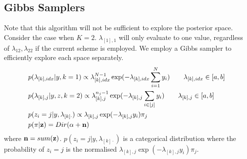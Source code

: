 \documentclass{article}
\begin{document}
\subsection{Gibbs Samplers}
Note that this algorithm will not be sufficient to explore the posterior space. Consider the case when $K=2$. $\lambda_{[1],1}$ will only evaluate to one value, regardless of $\lambda_{12}, \lambda_{22}$ if the current scheme is employed. We employ a Gibbs sampler to efficiently explore each space separately.
\begin{align}
& p(\lambda_{[k],idx}|y,k=1) \propto \lambda_{[k],idx}^{N-1}\exp(-\lambda_{[k],idx}\sum_{i=1}^{N}y_i)\qquad \lambda_{[k],idx}\in[a,b]\\
& p(\lambda_{[k],j}|y,z,k=2) \propto \lambda_{[k],j}^{n_j-1}\exp(-\lambda_{[k],j}\sum_{i\in[j]}y_i)\qquad \lambda_{[k],j}\in[a,b]\\
& p(z_i=j|y,\lambda_{[k]\cdot}) \propto \lambda_{[k],j}\exp(-\lambda_{[k],j}y_i)\pi_j\\
& p(\pi|\mathbf{z}) = Dir(\alpha+\mathbf{n})
\end{align}
where $\mathbf{n}=sum(\mathbf{z})$. $p(z_i=j|y,\lambda_{[k]\cdot})$ is a categorical distribution where the probability of $z_i=j$ is the normalised $\lambda_{[k],j}\exp(-\lambda_{[k],j}y_i)\pi_j$.
\end{document}
